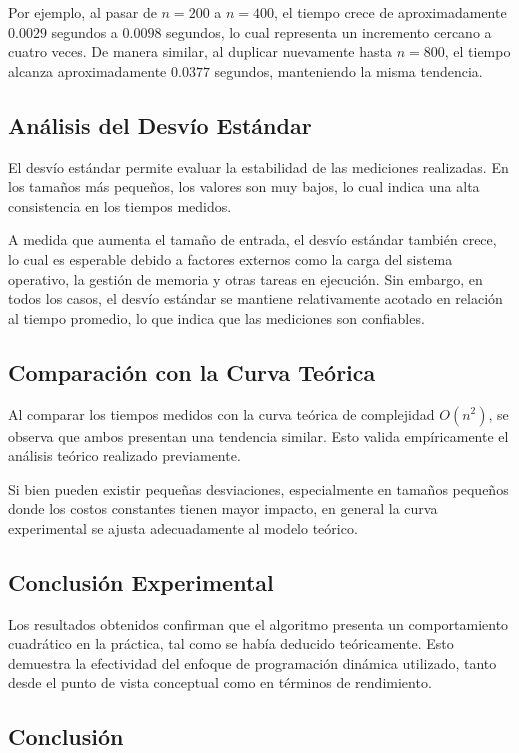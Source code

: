 Por ejemplo, al pasar de $n = 200$ a $n = 400$, el tiempo crece de aproximadamente $0.0029$ segundos a $0.0098$ segundos, lo cual representa un incremento cercano a cuatro veces. De manera similar, al duplicar nuevamente hasta $n = 800$, el tiempo alcanza aproximadamente $0.0377$ segundos, manteniendo la misma tendencia.

\subsection{Análisis del Desvío Estándar}

El desvío estándar permite evaluar la estabilidad de las mediciones realizadas. En los tamaños más pequeños, los valores son muy bajos, lo cual indica una alta consistencia en los tiempos medidos.

A medida que aumenta el tamaño de entrada, el desvío estándar también crece, lo cual es esperable debido a factores externos como la carga del sistema operativo, la gestión de memoria y otras tareas en ejecución. Sin embargo, en todos los casos, el desvío estándar se mantiene relativamente acotado en relación al tiempo promedio, lo que indica que las mediciones son confiables.

\subsection{Comparación con la Curva Teórica}

Al comparar los tiempos medidos con la curva teórica de complejidad $O(n^2)$, se observa que ambos presentan una tendencia similar. Esto valida empíricamente el análisis teórico realizado previamente.

Si bien pueden existir pequeñas desviaciones, especialmente en tamaños pequeños donde los costos constantes tienen mayor impacto, en general la curva experimental se ajusta adecuadamente al modelo teórico.

\subsection{Conclusión Experimental}

Los resultados obtenidos confirman que el algoritmo presenta un comportamiento cuadrático en la práctica, tal como se había deducido teóricamente. Esto demuestra la efectividad del enfoque de programación dinámica utilizado, tanto desde el punto de vista conceptual como en términos de rendimiento.

\subsection{Conclusión}


